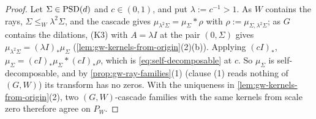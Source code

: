 \begin{proof}
\leanok
Let $\Sigma \in \mathrm{PSD}(d)$ and $c \in (0,1)$, and put $\lambda := c^{-1} > 1$. As $W$ contains the rays,
$\Sigma \le_W \lambda^2\Sigma$, and the cascade gives $\mu_{\lambda^2\Sigma} = \mu_\Sigma * \rho$ with
$\rho := \mu_{\Sigma,\lambda^2\Sigma}$; as $G$ contains the dilations, (K3) with $A = \lambda I$ at the
pair $(0, \Sigma)$ gives $\mu_{\lambda^2\Sigma} = (\lambda I)_*\mu_\Sigma$
(\ref{lem:gw-kernels-from-origin}(2)(b)). Applying $(cI)_*$,
$\mu_\Sigma = (cI)_*\mu_\Sigma * (cI)_*\rho$, which is \ref{eq:self-decomposable} at $c$. So $\mu_\Sigma$
is self-decomposable, and by \ref{prop:gw-ray-families}(1) (clause (1) reads nothing of $(G, W)$) its
transform has no zeros. With the uniqueness in \ref{lem:gw-kernels-from-origin}(2), two $(G, W)$-cascade
families with the same kernels from scale zero therefore agree on $P_W$.
\end{proof}

